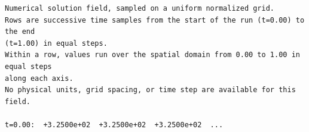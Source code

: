 \begin{verbatim}
Numerical solution field, sampled on a uniform normalized grid.
Rows are successive time samples from the start of the run (t=0.00) to the end
(t=1.00) in equal steps.
Within a row, values run over the spatial domain from 0.00 to 1.00 in equal steps
along each axis.
No physical units, grid spacing, or time step are available for this field.

t=0.00:  +3.2500e+02  +3.2500e+02  +3.2500e+02  ...
\end{verbatim}